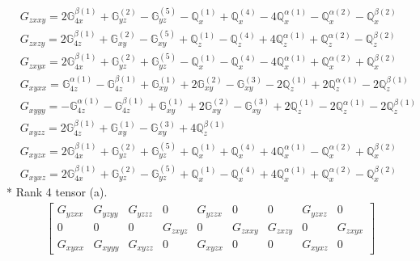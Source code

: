\documentclass[fleqn,8pt,landscape]{jsarticle}
\begin{document}
\begin{align*}
& G_{zxxy} = 2 \mathbb{G}_{4x}^{\beta(1)} + \mathbb{G}_{yz}^{(2)} - \mathbb{G}_{yz}^{(5)} - \mathbb{Q}_{x}^{(1)} + \mathbb{Q}_{x}^{(4)} - 4 \mathbb{Q}_{x}^{\alpha(1)} - \mathbb{Q}_{x}^{\alpha(2)} - \mathbb{Q}_{x}^{\beta(2)} \\
& G_{zxzy} = 2 \mathbb{G}_{4z}^{\beta(1)} + \mathbb{G}_{xy}^{(2)} - \mathbb{G}_{xy}^{(5)} + \mathbb{Q}_{z}^{(1)} - \mathbb{Q}_{z}^{(4)} + 4 \mathbb{Q}_{z}^{\alpha(1)} + \mathbb{Q}_{z}^{\alpha(2)} - \mathbb{Q}_{z}^{\beta(2)} \\
& G_{zxyx} = 2 \mathbb{G}_{4x}^{\beta(1)} + \mathbb{G}_{yz}^{(2)} + \mathbb{G}_{yz}^{(5)} - \mathbb{Q}_{x}^{(1)} - \mathbb{Q}_{x}^{(4)} - 4 \mathbb{Q}_{x}^{\alpha(1)} + \mathbb{Q}_{x}^{\alpha(2)} + \mathbb{Q}_{x}^{\beta(2)} \\
& G_{xyxx} = \mathbb{G}_{4z}^{\alpha(1)} - \mathbb{G}_{4z}^{\beta(1)} + \mathbb{G}_{xy}^{(1)} + 2 \mathbb{G}_{xy}^{(2)} - \mathbb{G}_{xy}^{(3)} - 2 \mathbb{Q}_{z}^{(1)} + 2 \mathbb{Q}_{z}^{\alpha(1)} - 2 \mathbb{Q}_{z}^{\beta(1)} \\
& G_{xyyy} = - \mathbb{G}_{4z}^{\alpha(1)} - \mathbb{G}_{4z}^{\beta(1)} + \mathbb{G}_{xy}^{(1)} + 2 \mathbb{G}_{xy}^{(2)} - \mathbb{G}_{xy}^{(3)} + 2 \mathbb{Q}_{z}^{(1)} - 2 \mathbb{Q}_{z}^{\alpha(1)} - 2 \mathbb{Q}_{z}^{\beta(1)} \\
& G_{xyzz} = 2 \mathbb{G}_{4z}^{\beta(1)} + \mathbb{G}_{xy}^{(1)} - \mathbb{G}_{xy}^{(3)} + 4 \mathbb{Q}_{z}^{\beta(1)} \\
& G_{xyzx} = 2 \mathbb{G}_{4x}^{\beta(1)} + \mathbb{G}_{yz}^{(2)} + \mathbb{G}_{yz}^{(5)} + \mathbb{Q}_{x}^{(1)} + \mathbb{Q}_{x}^{(4)} + 4 \mathbb{Q}_{x}^{\alpha(1)} - \mathbb{Q}_{x}^{\alpha(2)} + \mathbb{Q}_{x}^{\beta(2)} \\
& G_{xyxz} = 2 \mathbb{G}_{4x}^{\beta(1)} + \mathbb{G}_{yz}^{(2)} - \mathbb{G}_{yz}^{(5)} + \mathbb{Q}_{x}^{(1)} - \mathbb{Q}_{x}^{(4)} + 4 \mathbb{Q}_{x}^{\alpha(1)} + \mathbb{Q}_{x}^{\alpha(2)} - \mathbb{Q}_{x}^{\beta(2)}
\end{align*}
* Rank 4 tensor (a).
\begin{align*}
\begin{bmatrix} G_{yzxx} & G_{yzyy} & G_{yzzz} & 0 & G_{yzzx} & 0 & 0 & G_{yzxz} & 0 \\ 0 & 0 & 0 & G_{zxyz} & 0 & G_{zxxy} & G_{zxzy} & 0 & G_{zxyx} \\ G_{xyxx} & G_{xyyy} & G_{xyzz} & 0 & G_{xyzx} & 0 & 0 & G_{xyxz} & 0 \end{bmatrix}
\end{align*}
\end{document}
